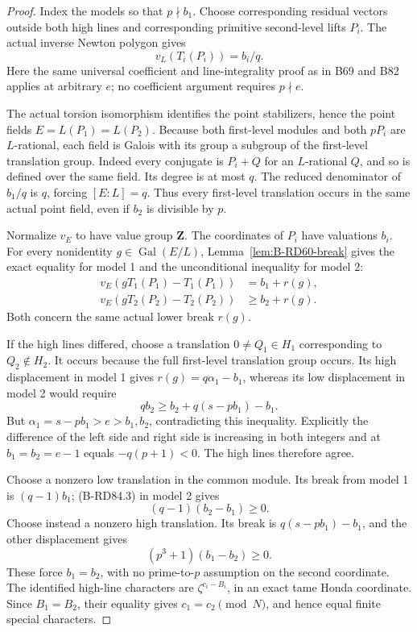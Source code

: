 \begin{proof}
Index the models so that \(p\nmid b_1\). Choose corresponding
residual vectors outside both high lines and corresponding
primitive second-level lifts \(P_i\). The actual inverse
Newton polygon gives
\[
                     v_L(T_i(P_i))=b_i/q.             \tag{B-RD84.2}
\]
Here the same universal coefficient and line-integrality
proof as in B69 and B82 applies at arbitrary \(e\);
no coefficient argument requires \(p\nmid e\).

The actual torsion isomorphism identifies the point
stabilizers, hence the point fields \(E=L(P_1)=L(P_2)\).
Because both first-level modules and both \(pP_i\) are
\(L\)-rational, each field is Galois with its group a
subgroup of the first-level translation group. Indeed
every conjugate is \(P_i+Q\) for an \(L\)-rational \(Q\),
and so is defined over the same field. Its degree is at
most \(q\). The reduced denominator of \(b_1/q\) is
\(q\), forcing \([E:L]=q\). Thus every first-level
translation occurs in the same actual point field, even
if \(b_2\) is divisible by \(p\).

Normalize \(v_E\) to have value group \(\mathbf Z\).
The coordinates of \(P_i\) have valuations \(b_i\).
For every nonidentity \(g\in\operatorname{Gal}(E/L)\),
Lemma~\ref{lem:B-RD60-break} gives the exact equality
for model 1 and the unconditional inequality for model 2:
\[
 \begin{split}
 v_E(gT_1(P_1)-T_1(P_1))&=b_1+r(g),\\
 v_E(gT_2(P_2)-T_2(P_2))&\ge b_2+r(g).
 \end{split}                                         \tag{B-RD84.3}
\]
Both concern the same actual lower break \(r(g)\).

If the high lines differed, choose a translation
\(0\ne Q_1\in H_1\) corresponding to \(Q_2\notin H_2\).
It occurs because the full first-level translation group
occurs. Its high displacement in model 1 gives
\(r(g)=q\alpha_1-b_1\), whereas its low displacement
in model 2 would require
\[
                  qb_2\ge b_2+q(s-pb_1)-b_1.         \tag{B-RD84.4}
\]
But \(\alpha_1=s-pb_1>e>b_1,b_2\), contradicting this
inequality. Explicitly the difference of the left side
and right side is increasing in both integers and at
\(b_1=b_2=e-1\) equals \(-q(p+1)<0\).
The high lines therefore agree.

Choose a nonzero low translation in the common module.
Its break from model 1 is \((q-1)b_1\); (B-RD84.3)
in model 2 gives
\[
                     (q-1)(b_2-b_1)\ge0.             \tag{B-RD84.5}
\]
Choose instead a nonzero high translation. Its break is
\(q(s-pb_1)-b_1\), and the other displacement gives
\[
                     (p^3+1)(b_1-b_2)\ge0.           \tag{B-RD84.6}
\]
These force \(b_1=b_2\), with no prime-to-\(p\) assumption
on the second coordinate. The identified high-line
characters are \(\zeta^{c_i-B_i}\), in an exact tame
Honda coordinate. Since \(B_1=B_2\), their equality
gives \(c_1=c_2\pmod N\), and hence equal finite
special characters.
\end{proof}

